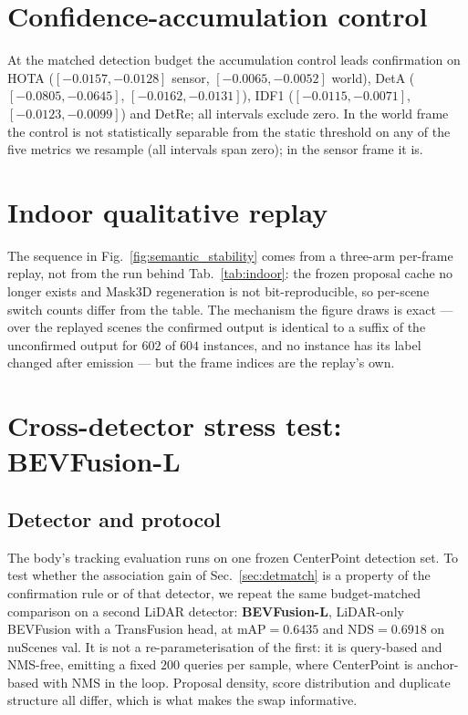 \section{Confidence-accumulation control}
\label{supp:cbmot}
At the matched detection budget the accumulation control leads confirmation on
HOTA ($[{-}0.0157,{-}0.0128]$ sensor, $[{-}0.0065,{-}0.0052]$ world), DetA
($[{-}0.0805,{-}0.0645]$, $[{-}0.0162,{-}0.0131]$), IDF1
($[{-}0.0115,{-}0.0071]$, $[{-}0.0123,{-}0.0099]$) and DetRe; all intervals
exclude zero. In the world frame the control is not statistically separable
from the static threshold on any of the five metrics we resample (all
intervals span zero); in the sensor frame it is.

\section{Indoor qualitative replay}
\label{supp:fig3}
The sequence in Fig.~\ref{fig:semantic_stability} comes from a three-arm
per-frame replay, not from the run behind Tab.~\ref{tab:indoor}: the frozen
proposal cache no longer exists and Mask3D regeneration is not
bit-reproducible, so per-scene switch counts differ from the table. The
mechanism the figure draws is exact --- over the replayed scenes the confirmed
output is identical to a suffix of the unconfirmed output for $602$ of $604$
instances, and no instance has its label changed after emission --- but the
frame indices are the replay's own.


\section{Cross-detector stress test: BEVFusion-L}
\label{supp:crossdet}

\subsection*{Detector and protocol}
The body's tracking evaluation runs on one frozen CenterPoint detection set.
To test whether the association gain of Sec.~\ref{sec:detmatch} is a property
of the confirmation rule or of that detector, we repeat the same
budget-matched comparison on a second LiDAR detector: \textbf{BEVFusion-L},
LiDAR-only BEVFusion with a TransFusion head, at $\mathrm{mAP}=0.6435$ and
$\mathrm{NDS}=0.6918$ on nuScenes val. It is not a re-parameterisation of the
first: it is query-based and NMS-free, emitting a fixed $200$ queries per
sample, where CenterPoint is anchor-based with NMS in the loop. Proposal
density, score distribution and duplicate structure all differ, which is what
makes the swap informative.

